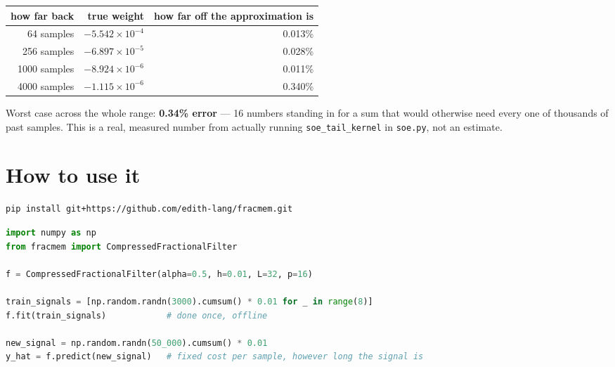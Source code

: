 \documentclass[11pt]{article}
\begin{document}
\begin{table}[h]
\centering
\small
\begin{tabular}{rrr}
\toprule
how far back & true weight & how far off the approximation is \\
\midrule
64 samples   & $-5.542\times10^{-4}$ & 0.013\% \\
256 samples  & $-6.897\times10^{-5}$ & 0.028\% \\
1000 samples & $-8.924\times10^{-6}$ & 0.011\% \\
4000 samples & $-1.115\times10^{-6}$ & 0.340\% \\
\bottomrule
\end{tabular}
\end{table}

Worst case across the whole range: \textbf{0.34\% error} --- 16 numbers standing in for a sum that would otherwise need every one of thousands of past samples. This is a real, measured number from actually running \texttt{soe\_tail\_kernel} in \texttt{soe.py}, not an estimate.

\section{How to use it}

\begin{lstlisting}[language=bash]
pip install git+https://github.com/edith-lang/fracmem.git
\end{lstlisting}

\begin{lstlisting}[language=Python]
import numpy as np
from fracmem import CompressedFractionalFilter

f = CompressedFractionalFilter(alpha=0.5, h=0.01, L=32, p=16)

train_signals = [np.random.randn(3000).cumsum() * 0.01 for _ in range(8)]
f.fit(train_signals)            # done once, offline

new_signal = np.random.randn(50_000).cumsum() * 0.01
y_hat = f.predict(new_signal)   # fixed cost per sample, however long the signal is
\end{lstlisting}
\end{document}
